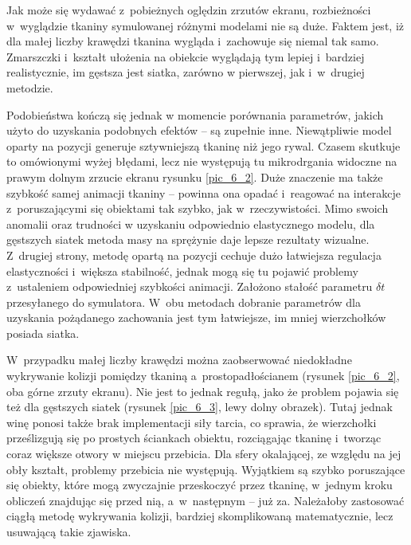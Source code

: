 		
		Jak może się wydawać z~pobieżnych oględzin zrzutów ekranu, rozbieżności w~wyglądzie tkaniny symulowanej różnymi modelami nie są duże. Faktem jest, iż dla małej liczby krawędzi tkanina wygląda i~zachowuje się niemal tak samo. Zmarszczki i~kształt ułożenia na obiekcie wyglądają tym lepiej i~bardziej realistycznie, im gęstsza jest siatka, zarówno w pierwszej, jak i~w~drugiej metodzie. 
		
		Podobieństwa kończą się jednak w momencie porównania parametrów, jakich użyto do uzyskania podobnych efektów -- są zupełnie inne. Niewątpliwie model oparty na pozycji generuje sztywniejszą tkaninę niż jego rywal. Czasem skutkuje to omówionymi wyżej błędami, lecz nie występują tu mikrodrgania widoczne na prawym dolnym zrzucie ekranu rysunku \ref{pic_6_2}. Duże znaczenie ma także szybkość samej animacji tkaniny -- powinna ona opadać i~reagować na interakcje z~poruszającymi się obiektami tak szybko, jak w~rzeczywistości. Mimo swoich anomalii oraz trudności w uzyskaniu odpowiednio elastycznego modelu, dla gęstszych siatek metoda masy na sprężynie daje lepsze rezultaty wizualne. Z~drugiej strony, metodę opartą na pozycji cechuje dużo łatwiejsza regulacja elastyczności i~większa stabilność, jednak mogą się tu pojawić problemy z~ustaleniem odpowiedniej szybkości animacji. Założono stałość parametru \(\delta t \) przesyłanego do symulatora. W~obu metodach dobranie parametrów dla uzyskania pożądanego zachowania jest tym łatwiejsze, im mniej wierzchołków posiada siatka.
		
		W~przypadku małej liczby krawędzi można zaobserwować niedokładne wykrywanie kolizji pomiędzy tkaniną a~prostopadłościanem (rysunek \ref{pic_6_2}, oba górne zrzuty ekranu). Nie jest to jednak regułą, jako że problem pojawia się też dla gęstszych siatek (rysunek \ref{pic_6_3}, lewy dolny obrazek). Tutaj jednak winę ponosi także brak implementacji siły tarcia, co sprawia, że wierzchołki prześlizgują się po prostych ściankach obiektu, rozciągając tkaninę i~tworząc coraz większe otwory w miejscu przebicia. Dla sfery okalającej, ze względu na jej obły kształt, problemy przebicia nie występują. Wyjątkiem są szybko poruszające się obiekty, które mogą zwyczajnie przeskoczyć przez tkaninę, w~jednym kroku obliczeń znajdując się przed nią, a~w~następnym -- już za. Należałoby zastosować ciągłą metodę wykrywania kolizji, bardziej skomplikowaną matematycznie, lecz usuwającą takie zjawiska.
		

